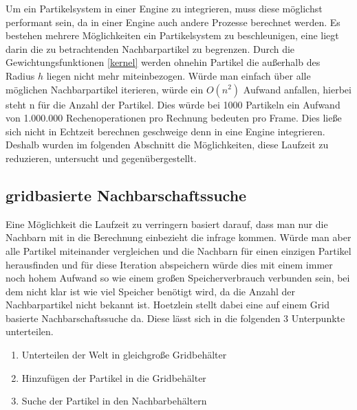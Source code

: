\documentclass[intern,palatino]{cgBA}
\begin{document}
Um ein Partikelsystem in einer Engine zu integrieren, muss diese möglichst performant sein, da in einer Engine auch andere Prozesse berechnet werden. Es bestehen mehrere Möglichkeiten ein Partikelsystem zu beschleunigen, eine liegt darin die zu betrachtenden Nachbarpartikel zu begrenzen. Durch die Gewichtungsfunktionen \ref{kernel} werden ohnehin Partikel die außerhalb des Radius $h$ liegen nicht mehr miteinbezogen. Würde man einfach über alle möglichen Nachbarpartikel iterieren, würde ein $O(n^2)$ Aufwand anfallen, hierbei steht n für die Anzahl der Partikel. Dies würde bei 1000 Partikeln ein Aufwand von 1.000.000 Rechenoperationen pro Rechnung bedeuten pro Frame. Dies ließe sich nicht in Echtzeit berechnen geschweige denn in eine Engine integrieren. Deshalb wurden im folgenden Abschnitt die Möglichkeiten, diese Laufzeit zu reduzieren, untersucht und gegenübergestellt.  


\subsection{gridbasierte Nachbarschaftssuche}\label{nachbar}

Eine Möglichkeit die Laufzeit zu verringern basiert darauf, dass man nur die Nachbarn mit in die Berechnung einbezieht die infrage kommen. Würde man aber alle Partikel miteinander vergleichen und die Nachbarn für einen einzigen Partikel herausfinden und für diese Iteration abspeichern würde dies mit einem immer noch hohem Aufwand so wie einem großen Speicherverbrauch verbunden sein, bei dem nicht klar ist wie viel Speicher benötigt wird, da die Anzahl der Nachbarpartikel nicht bekannt ist.
\newline
Hoetzlein \cite{nvidia} stellt dabei eine auf einem Grid basierte Nachbarschaftssuche da. Diese lässt sich in die folgenden 3 Unterpunkte unterteilen.

\begin{enumerate}
	\item Unterteilen der Welt in gleichgroße Gridbehälter
	\item Hinzufügen der Partikel in die Gridbehälter
	\item Suche der Partikel in den Nachbarbehältern 
\end{enumerate}
\end{document}
